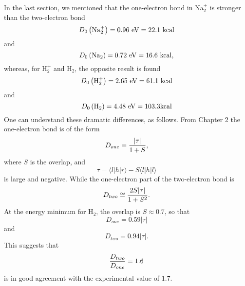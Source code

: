 In the last section, we mentioned that the one-electron bond in 
Na$_2^+$ is stronger than the two-electron bond
\begin{equation}
D_0 \left( {\rm Na}^+_2 \right) = 0.96 ~ {\rm eV} = 22.1 ~ {\rm kcal}
\end{equation}
and
\begin{equation}
D_0 \left( {\rm Na}_2 \right) = 0.72 ~ {\rm eV} = 16.6 ~ {\rm kcal},
\end{equation}
whereas, for H$^+_2$ and H$_2$, the opposite result is found
\begin{equation}
D_0 \left( {\rm H}^+_2 \right) = 2.65 ~ {\rm eV} = 61.1 ~ {\rm kcal}
\end{equation}
and
\begin{equation}
D_0 \left( {\rm H}_2 \right) = 4.48~{\rm eV} = 103.3 {\rm kcal}
\end{equation}
One can understand these dramatic differences, as follows.  From 
Chapter 2 the one-electron bond is of the form
\begin{equation}
D_{one} = {| \tau | \over 1 + S} ,
\end{equation}
where $S$ is the overlap, and
\begin{equation}
\tau = \langle l | h | r \rangle - S \langle l | h | l \rangle
\end{equation}
is large and negative.  While the 
one-electron part of the two-electron bond is
\begin{equation}
D_{two} \cong {2S|\tau| \over 1 + S^2} .
\end{equation}
At the energy minimum for H$_2$, the overlap is $S \approx 0.7$, so that
\begin{equation}
D_{one} = 0. 59 | \tau |
\end{equation}
and
\begin{equation}
D_{two} =  0.94 | \tau | .
\end{equation}
This suggests that
\begin{equation}
{D_{two} \over D_{one}} = 1.6
\end{equation}
is in good agreement with the experimental value of 1.7.

